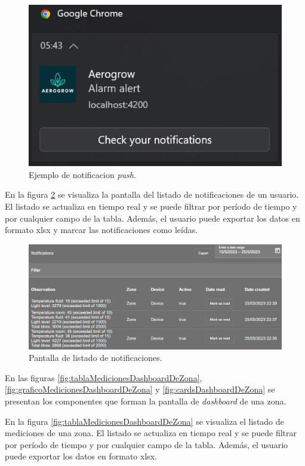 \begin{figure}[H]
	\centering
	\includegraphics[width=.6\textwidth]{./Figures/Notificacion push.png}
	\caption{Ejemplo de notificacion \emph{push}.}
	\label{fig:notificacionPushEmail}
\end{figure}

En la figura \ref{fig:listaDeNotificaciones} se visualiza la pantalla del listado de notificaciones de un usuario. El listado se actualiza en tiempo real y se puede filtrar por período de tiempo y por cualquier campo de la tabla. Además, el usuario puede exportar los datos en formato xlsx y marcar las notificaciones como leídas.

\begin{figure}[H]
	\centering
	\includegraphics[width=.9\textwidth]{./Figures/Frontend lista de notificaciones.png}
	\caption{Pantalla de listado de notificaciones.}
	\label{fig:listaDeNotificaciones}
\end{figure}

En las figuras \ref{fig:tablaMedicionesDashboardDeZona}, \ref{fig:graficoMedicionesDashboardDeZona} y \ref{fig:cardsDashboardDeZona} se presentan los componentes que forman la pantalla de \emph{dashboard} de una zona. 

En la figura \ref{fig:tablaMedicionesDashboardDeZona} se visualiza el listado de mediciones de una zona. El listado se actualiza en tiempo real y se puede filtrar por período de tiempo y por cualquier campo de la tabla. Además, el usuario puede exportar los datos en formato xlsx.

